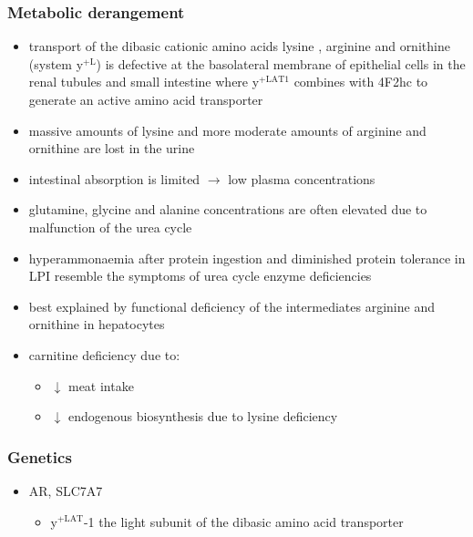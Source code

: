 \documentclass{scrartcl}
\begin{document}
\subsubsection{Metabolic derangement}
\label{sec:orge3191a5}
\begin{itemize}
\item transport of the dibasic cationic amino acids lysine , arginine and
ornithine (system y\(^{\text{+L}}\)) is defective at the basolateral membrane of
epithelial cells in the renal tubules and small intestine where
y\(^{\text{+LAT1}}\) combines with 4F2hc to generate an active amino acid
transporter
\item massive amounts of lysine and more moderate amounts of arginine and
ornithine are lost in the urine
\item intestinal absorption is limited \(\to\) low plasma concentrations
\item glutamine, glycine and alanine concentrations are often elevated due
to malfunction of the urea cycle
\item hyperammonaemia after protein ingestion and diminished protein
tolerance in LPI resemble the symptoms of urea cycle enzyme
deficiencies
\item best explained by functional deficiency of the intermediates
arginine and ornithine in hepatocytes
\item carnitine deficiency due to:
\begin{itemize}
\item \(\downarrow\) meat intake
\item \(\downarrow\) endogenous biosynthesis due to lysine deficiency
\end{itemize}
\end{itemize}

\subsubsection{Genetics}
\label{sec:org5bda4e1}
\begin{itemize}
\item AR, SLC7A7
\begin{itemize}
\item y\(^{\text{+LAT}}\)-1 the light subunit of the dibasic amino acid
transporter
\end{itemize}
\end{itemize}
\end{document}
